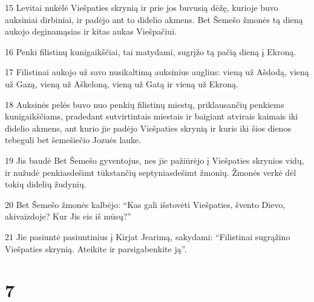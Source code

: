 \par 15 Levitai nukėlė Viešpaties skrynią ir prie jos buvusią dėžę, kurioje buvo auksiniai dirbiniai, ir padėjo ant to didelio akmens. Bet Šemešo žmonės tą dieną aukojo deginamąsias ir kitas aukas Viešpačiui. 
\par 16 Penki filistinų kunigaikščiai, tai matydami, sugrįžo tą pačią dieną į Ekroną. 
\par 17 Filistinai aukojo už savo nusikaltimą auksinius auglius: vieną už Ašdodą, vieną už Gazą, vieną už Aškeloną, vieną už Gatą ir vieną už Ekroną. 
\par 18 Auksinės pelės buvo nuo penkių filistinų miestų, priklausančių penkiems kunigaikščiams, pradedant sutvirtintais miestais ir baigiant atvirais kaimais iki didelio akmens, ant kurio jie padėjo Viešpaties skrynią ir kuris iki šios dienos tebeguli bet šemešiečio Jozuės lauke. 
\par 19 Jis baudė Bet Šemešo gyventojus, nes jie pažiūrėjo į Viešpaties skrynios vidų, ir nužudė penkiasdešimt tūkstančių septyniasdešimt žmonių. Žmonės verkė dėl tokių didelių žudynių. 
\par 20 Bet Šemešo žmonės kalbėjo: “Kas gali išstovėti Viešpaties, švento Dievo, akivaizdoje? Kur Jis eis iš mūsų?” 
\par 21 Jie pasiuntė pasiuntinius į Kirjat Jearimą, sakydami: “Filistinai sugrąžino Viešpaties skrynią. Ateikite ir parsigabenkite ją”.



\chapter{7}

